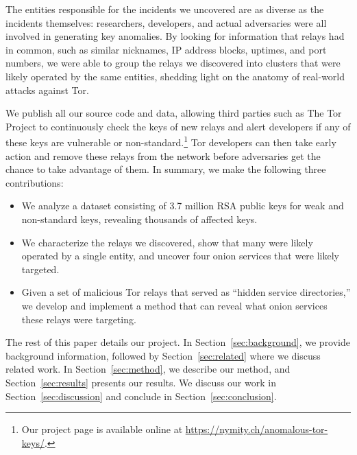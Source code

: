 The entities responsible for the incidents we uncovered are as diverse as the
incidents themselves: researchers, developers, and actual adversaries were all
involved in generating key anomalies.  By looking for information that relays
had in common, such as similar nicknames, IP address blocks, uptimes, and port
numbers, we were able to group the relays we discovered into clusters that were
likely operated by the same entities, shedding light on the anatomy of
real-world attacks against Tor.

We publish all our source code and data, allowing third parties such as The Tor
Project to continuously check the keys of new relays and alert developers if
any of these keys are vulnerable or non-standard.\footnote{Our project page is
available online at \url{https://nymity.ch/anomalous-tor-keys/}.}  Tor
developers can then take early action and remove these relays from the network
before adversaries get the chance to take advantage of them.  In summary, we
make the following three contributions:
\begin{itemize}
	\item We analyze a dataset consisting of 3.7 million RSA public keys for
		weak and non-standard keys, revealing thousands of affected keys.

	\item We characterize the relays we discovered, show that many were
		likely operated by a single entity, and uncover four onion services that
		were likely targeted.

	\item Given a set of malicious Tor relays that served as ``hidden service
		directories,'' we develop and implement a method that can reveal what
		onion services these relays were targeting.
\end{itemize}

The rest of this paper details our project.  In Section~\ref{sec:background}, we
provide background information, followed by Section~\ref{sec:related} where we 
discuss related work.  In Section~\ref{sec:method}, we describe our method,
and Section~\ref{sec:results} presents our results.  We discuss our work in
Section~\ref{sec:discussion} and conclude in Section~\ref{sec:conclusion}.
